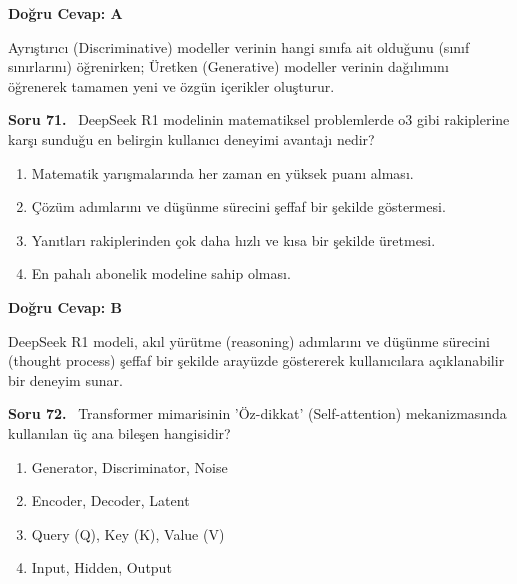 \documentclass[11pt,a4paper,openany]{book}
\begin{document}
\vspace{4pt}
\begin{tcolorbox}[title=Cevap ve Açıklama, colback=gray!3!white, colframe=primarycolor!90!black, arc=2mm, fonttitle=\bfseries\sffamily, top=6pt, bottom=6pt]
    \textbf{Doğru Cevap: A}

    \vspace{2pt}
    Ayrıştırıcı (Discriminative) modeller verinin hangi sınıfa ait olduğunu (sınıf sınırlarını) öğrenirken; Üretken (Generative) modeller verinin dağılımını öğrenerek tamamen yeni ve özgün içerikler oluşturur.
\end{tcolorbox}
\vspace{10pt}
\needspace{5cm}
\vspace{8pt}
\noindent\textbf{\large\sffamily Soru 71.} \ DeepSeek R1 modelinin matematiksel problemlerde o3 gibi rakiplerine karşı sunduğu en belirgin kullanıcı deneyimi avantajı nedir?

\begin{enumerate}[label=\Alph*), leftmargin=25pt, topsep=4pt, itemsep=2pt]
        \item Matematik yarışmalarında her zaman en yüksek puanı alması.
        \item Çözüm adımlarını ve düşünme sürecini şeffaf bir şekilde göstermesi.
        \item Yanıtları rakiplerinden çok daha hızlı ve kısa bir şekilde üretmesi.
        \item En pahalı abonelik modeline sahip olması.
\end{enumerate}

\vspace{4pt}
\begin{tcolorbox}[title=Cevap ve Açıklama, colback=gray!3!white, colframe=primarycolor!90!black, arc=2mm, fonttitle=\bfseries\sffamily, top=6pt, bottom=6pt]
    \textbf{Doğru Cevap: B}

    \vspace{2pt}
    DeepSeek R1 modeli, akıl yürütme (reasoning) adımlarını ve düşünme sürecini (thought process) şeffaf bir şekilde arayüzde göstererek kullanıcılara açıklanabilir bir deneyim sunar.
\end{tcolorbox}
\vspace{10pt}
\needspace{5cm}
\vspace{8pt}
\noindent\textbf{\large\sffamily Soru 72.} \ Transformer mimarisinin 'Öz-dikkat' (Self-attention) mekanizmasında kullanılan üç ana bileşen hangisidir?

\begin{enumerate}[label=\Alph*), leftmargin=25pt, topsep=4pt, itemsep=2pt]
        \item Generator, Discriminator, Noise
        \item Encoder, Decoder, Latent
        \item Query (Q), Key (K), Value (V)
        \item Input, Hidden, Output
\end{enumerate}
\end{document}
